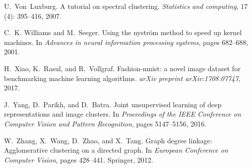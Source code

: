 \documentclass{article}
\begin{document}
\begin{thebibliography}{30}
U.~Von~Luxburg.
\newblock A tutorial on spectral clustering.
\newblock \emph{Statistics and computing}, 17 (4): 395--416,
  2007.

C.~K. Williams and M.~Seeger.
\newblock Using the nystr{\"o}m method to speed up kernel machines.
\newblock In \emph{Advances in neural information processing systems}, pages
  682--688, 2001.

H.~Xiao, K.~Rasul, and R.~Vollgraf.
\newblock Fashion-mnist: a novel image dataset for benchmarking machine
  learning algorithms.
\newblock \emph{arXiv preprint arXiv:1708.07747}, 2017.

J.~Yang, D.~Parikh, and D.~Batra.
\newblock Joint unsupervised learning of deep representations and image
  clusters.
\newblock In \emph{Proceedings of the IEEE Conference on Computer Vision and
  Pattern Recognition}, pages 5147--5156, 2016.

W.~Zhang, X.~Wang, D.~Zhao, and X.~Tang.
\newblock Graph degree linkage: Agglomerative clustering on a directed graph.
\newblock In \emph{European Conference on Computer Vision}, pages 428--441.
  Springer, 2012.

\end{thebibliography}
\end{document}
